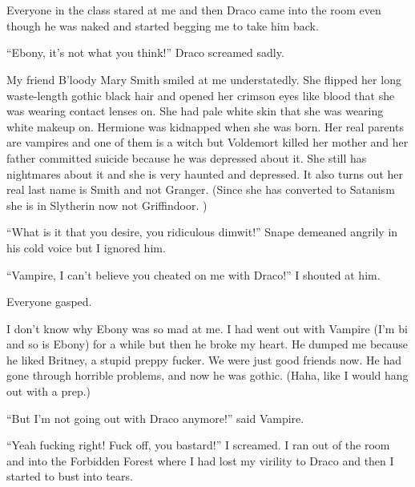 \section{}



Everyone in the class stared at me and then Draco came into the room even though he was naked and started begging me to take him back.

\enquote{Ebony, it's not what you think!} Draco screamed sadly.

\begin{sloppypar}
    My friend B'loody Mary Smith smiled at me understatedly. She flipped her long waste-length gothic black hair and opened her crimson eyes like blood that she was wearing contact lenses on. She had pale white skin that she was wearing white makeup on. Hermione was kidnapped when she was born. Her real parents are vampires and one of them is a witch but Voldemort killed her mother and her father committed suicide because he was depressed about it. She still has nightmares about it and she is very haunted and depressed. It also turns out her real last name is Smith and not Granger. (Since she has converted to Satanism she is in Slytherin now not Griffindoor. )
\end{sloppypar}

\enquote{What is it that you desire, you ridiculous dimwit!} Snape demeaned angrily in his cold voice but I ignored him.

\enquote{Vampire, I can't believe you cheated on me with Draco!} I shouted at him.

Everyone gasped.

I don't know why Ebony was so mad at me. I had went out with Vampire (I'm bi and so is Ebony) for a while but then he broke my heart. He dumped me because he liked Britney, a stupid preppy fucker. We were just good friends now. He had gone through horrible problems, and now he was gothic. (Haha, like I would hang out with a prep.)

\enquote{But I'm not going out with Draco anymore!} said Vampire.

\enquote{Yeah fucking right! Fuck off, you bastard!} I screamed. I ran out of the room and into the Forbidden Forest where I had lost my virility to Draco and then I started to bust into tears.
